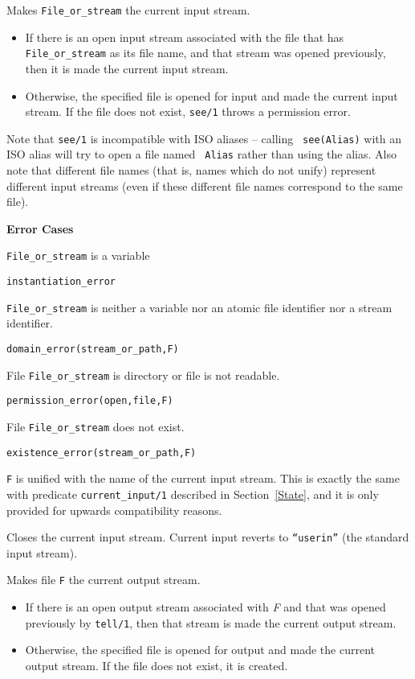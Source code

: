 \begin{description}
%
Makes {\tt File\_or\_stream} the current input stream. 
%
\begin{itemize}
\item If there is an open input stream associated with the file that
  has {\tt File\_or\_stream} as its file name, and that stream was
  opened previously, then it is made the current input stream.
%
\item Otherwise, the specified file is opened for input and made the
  current input stream. If the file does not exist, {\tt see/1} throws
  a permission error.
\end{itemize}
%
Note that {\tt see/1} is incompatible with ISO aliases -- calling {\tt
  see(Alias)} with an ISO alias will try to open a file named {\tt
  Alias} rather than using the alias.  Also note that different file
names (that is, names which do not unify) represent different input
streams (even if these different file names correspond to the same
file).

{\bf Error Cases}
\bi
\item  {\tt File\_or\_stream} is  a variable
\bi
\item {\tt instantiation\_error}
\ei
\item {\tt File\_or\_stream} is neither a variable nor an atomic file identifier nor
  a stream identifier.
\bi
\item {\tt domain\_error(stream\_or\_path,F)}
\ei
\item File {\tt File\_or\_stream} is directory or file is not readable. 
\bi
\item {\tt permission\_error(open,file,F)}
\ei
\item File {\tt File\_or\_stream} does not exist. 
\bi
\item {\tt existence\_error(stream\_or\_path,F)}
\ei
\ei

    {\tt F} is unified with the name of the current input stream.
    This is exactly the same with predicate {\tt current\_input/1}
    described in Section~\ref{State}, and it is only provided for
    upwards compatibility reasons.

    Closes the current input stream. 
    Current input reverts to {\tt ``userin''} (the standard input stream).

    Makes file {\tt F} the current output stream. 
    \begin{itemize}
    \item If there is an open output stream associated with {\em F}  
          and that was opened previously 
          by {\tt tell/1}, then that stream is made the current output 
	  stream. 
    \item Otherwise, the specified file is opened for output and made the
          current output stream. If the file does not exist, it is created.
    \end{itemize}


\end{description}
